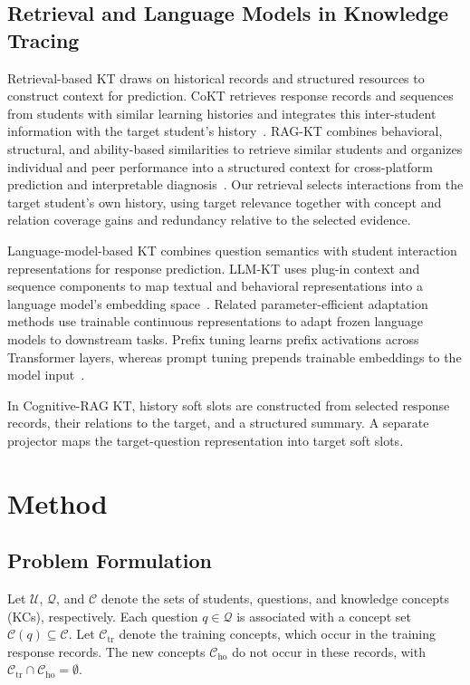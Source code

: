 \documentclass{llncs}
\begin{document}
\subsection{Retrieval and Language Models in Knowledge Tracing}

Retrieval-based KT draws on historical records and structured resources to construct context for prediction. CoKT retrieves response records and sequences from students with similar learning histories and integrates this inter-student information with the target student's history~\cite{long2022cokt}. RAG-KT combines behavioral, structural, and ability-based similarities to retrieve similar students and organizes individual and peer performance into a structured context for cross-platform prediction and interpretable diagnosis~\cite{duan2026ragkt}. Our retrieval selects interactions from the target student's own history, using target relevance together with concept and relation coverage gains and redundancy relative to the selected evidence.

Language-model-based KT combines question semantics with student interaction representations for response prediction. LLM-KT uses plug-in context and sequence components to map textual and behavioral representations into a language model's embedding space~\cite{wang2025llmkt}. Related parameter-efficient adaptation methods use trainable continuous representations to adapt frozen language models to downstream tasks. Prefix tuning learns prefix activations across Transformer layers, whereas prompt tuning prepends trainable embeddings to the model input~\cite{li2021prefixtuning,lester2021power}.

In Cognitive-RAG KT, history soft slots are constructed from selected response records, their relations to the target, and a structured summary. A separate projector maps the target-question representation into target soft slots.

\section{Method}

\subsection{Problem Formulation}

Let $\mathcal U$, $\mathcal Q$, and $\mathcal C$ denote the sets of students, questions, and knowledge concepts (KCs), respectively. Each question $q\in\mathcal Q$ is associated with a concept set $\mathcal C(q)\subseteq\mathcal C$. Let $\mathcal C_{\mathrm{tr}}$ denote the training concepts, which occur in the training response records. The new concepts $\mathcal C_{\mathrm{ho}}$ do not occur in these records, with $\mathcal C_{\mathrm{tr}}\cap\mathcal C_{\mathrm{ho}}=\emptyset$.
\end{document}
